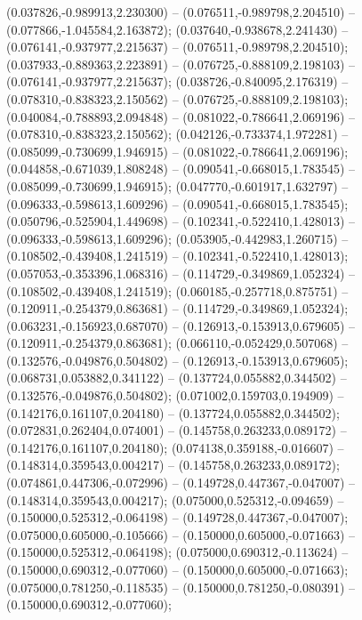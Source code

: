  (0.037826,-0.989913,2.230300) -- (0.076511,-0.989798,2.204510) -- (0.077866,-1.045584,2.163872);
 (0.037640,-0.938678,2.241430) -- (0.076141,-0.937977,2.215637) -- (0.076511,-0.989798,2.204510);
 (0.037933,-0.889363,2.223891) -- (0.076725,-0.888109,2.198103) -- (0.076141,-0.937977,2.215637);
 (0.038726,-0.840095,2.176319) -- (0.078310,-0.838323,2.150562) -- (0.076725,-0.888109,2.198103);
 (0.040084,-0.788893,2.094848) -- (0.081022,-0.786641,2.069196) -- (0.078310,-0.838323,2.150562);
 (0.042126,-0.733374,1.972281) -- (0.085099,-0.730699,1.946915) -- (0.081022,-0.786641,2.069196);
 (0.044858,-0.671039,1.808248) -- (0.090541,-0.668015,1.783545) -- (0.085099,-0.730699,1.946915);
 (0.047770,-0.601917,1.632797) -- (0.096333,-0.598613,1.609296) -- (0.090541,-0.668015,1.783545);
 (0.050796,-0.525904,1.449698) -- (0.102341,-0.522410,1.428013) -- (0.096333,-0.598613,1.609296);
 (0.053905,-0.442983,1.260715) -- (0.108502,-0.439408,1.241519) -- (0.102341,-0.522410,1.428013);
 (0.057053,-0.353396,1.068316) -- (0.114729,-0.349869,1.052324) -- (0.108502,-0.439408,1.241519);
 (0.060185,-0.257718,0.875751) -- (0.120911,-0.254379,0.863681) -- (0.114729,-0.349869,1.052324);
 (0.063231,-0.156923,0.687070) -- (0.126913,-0.153913,0.679605) -- (0.120911,-0.254379,0.863681);
 (0.066110,-0.052429,0.507068) -- (0.132576,-0.049876,0.504802) -- (0.126913,-0.153913,0.679605);
 (0.068731,0.053882,0.341122) -- (0.137724,0.055882,0.344502) -- (0.132576,-0.049876,0.504802);
 (0.071002,0.159703,0.194909) -- (0.142176,0.161107,0.204180) -- (0.137724,0.055882,0.344502);
 (0.072831,0.262404,0.074001) -- (0.145758,0.263233,0.089172) -- (0.142176,0.161107,0.204180);
 (0.074138,0.359188,-0.016607) -- (0.148314,0.359543,0.004217) -- (0.145758,0.263233,0.089172);
 (0.074861,0.447306,-0.072996) -- (0.149728,0.447367,-0.047007) -- (0.148314,0.359543,0.004217);
 (0.075000,0.525312,-0.094659) -- (0.150000,0.525312,-0.064198) -- (0.149728,0.447367,-0.047007);
 (0.075000,0.605000,-0.105666) -- (0.150000,0.605000,-0.071663) -- (0.150000,0.525312,-0.064198);
 (0.075000,0.690312,-0.113624) -- (0.150000,0.690312,-0.077060) -- (0.150000,0.605000,-0.071663);
 (0.075000,0.781250,-0.118535) -- (0.150000,0.781250,-0.080391) -- (0.150000,0.690312,-0.077060);
